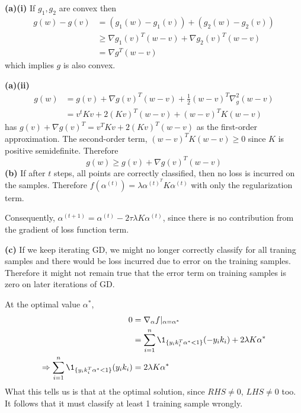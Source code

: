 \documentclass[a4paper, 12pt]{article}
\begin{document}
\begin{problem} [Problem 2]
\end{problem}
\begin{solution}
\textbf{(a)(i)}
If $g_1, g_2$ are convex then
\begin{align*}
g(w) - g(v) &= (g_1(w) - g_1(v)) + (g_2(w) - g_2(v)) \\
&\geq \nabla g_1(v)^T (w-v) + \nabla g_2(v)^T (w-v) \\
&= \nabla g^T (w - v)
\end{align*}
which implies $g$ is also convex.

\textbf{(a)(ii)}
\begin{align*}
    g(w) &= g(v) + \nabla g(v)^T  (w-v) + \frac{1}{2}(w-v)^T \nabla^2_g (w-v) \\
    &= v^tKv + 2(Kv)^T(w-v) + (w-v)^TK(w-v) 
\end{align*}
has $g(v) + \nabla g(v)^T = v^TKv + 2(Kv)^T(w-v)$ as the first-order approximation. The second-order term, $(w-v)^TK(w-v) \geq 0$ since $K$ is positive semidefinite. Therefore \[
g(w)  \geq g(v) + \nabla g(v)^T (w-v)
\]
\textbf{(b)} If after $t$ steps, all points are correctly classified, then no loss is incurred on the samples. Therefore $f(\alpha^{(t)}) = \lambda \alpha^{(t)^T} K \alpha^{(t)}$ with only the regularization term. 

Consequently, $\alpha^{(t+1)} = \alpha^{(t)} - 2 \tau \lambda K \alpha^{(t)}$, since there is no contribution from the gradient of loss function term.

\textbf{(c)} If we keep iterating GD, we might no longer correctly classify for all traning samples and there would be loss incurred due to error on the training samples. Therefore it might not remain true that the error term on training samples is zero on later iterations of GD.

At the optimal value $\alpha^*$, 
\begin{align*}
    0 &= \nabla_\alpha f|_{\alpha = \alpha^*}\\
    &= \sum_{i=1}^{n} \1_{\{y_i k_i^T \alpha^* < 1\}} (-y_i k_i) + 2 \lambda K \alpha^*\\
    \implies \sum_{i=1}^{n} \1_{\{y_i k_i^T \alpha^* < 1\}} (y_i k_i) &= 2 \lambda K \alpha^*
\end{align*}
What this tells us is that at the optimal solution, since $RHS \neq 0$, $LHS \neq 0$ too. It follows that it must classify at least 1 training sample wrongly.
\end{solution}
\end{document}
